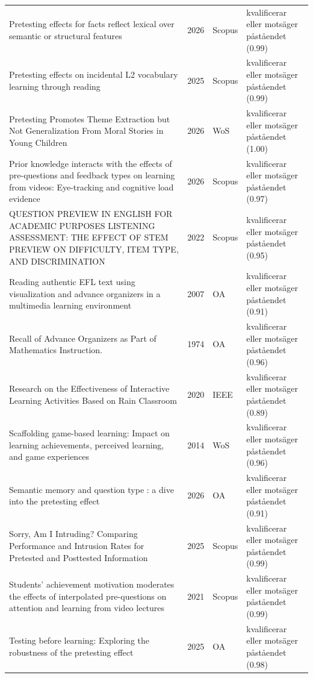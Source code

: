 \begin{longtable}{@{}%
  >{\raggedright\arraybackslash}p{}c%
  >{\raggedright\arraybackslash}p{}%
  >{\raggedright\arraybackslash}p{}@{}}
Pretesting effects for facts reflect lexical over semantic or structural features & 2026 & Scopus & kvalificerar eller motsäger påståendet (0.99) \\
Pretesting effects on incidental L2 vocabulary learning through reading & 2025 & Scopus & kvalificerar eller motsäger påståendet (0.99) \\
Pretesting Promotes Theme Extraction but Not Generalization From Moral Stories in Young Children & 2026 & WoS & kvalificerar eller motsäger påståendet (1.00) \\
Prior knowledge interacts with the effects of pre-questions and feedback types on learning from videos: Eye-tracking and cognitive load evidence & 2026 & Scopus & kvalificerar eller motsäger påståendet (0.97) \\
QUESTION PREVIEW IN ENGLISH FOR ACADEMIC PURPOSES LISTENING ASSESSMENT: THE EFFECT OF STEM PREVIEW ON DIFFICULTY, ITEM TYPE, AND DISCRIMINATION & 2022 & Scopus & kvalificerar eller motsäger påståendet (0.95) \\
Reading authentic EFL text using visualization and advance organizers in a multimedia learning environment & 2007 & OA & kvalificerar eller motsäger påståendet (0.91) \\
Recall of Advance Organizers as Part of Mathematics Instruction. & 1974 & OA & kvalificerar eller motsäger påståendet (0.96) \\
Research on the Effectiveness of Interactive Learning Activities Based on Rain Classroom & 2020 & IEEE & kvalificerar eller motsäger påståendet (0.89) \\
Scaffolding game-based learning: Impact on learning achievements, perceived learning, and game experiences & 2014 & WoS & kvalificerar eller motsäger påståendet (0.96) \\
Semantic memory and question type : a dive into the pretesting effect & 2026 & OA & kvalificerar eller motsäger påståendet (0.91) \\
Sorry, Am I Intruding? Comparing Performance and Intrusion Rates for Pretested and Posttested Information & 2025 & Scopus & kvalificerar eller motsäger påståendet (0.99) \\
Students' achievement motivation moderates the effects of interpolated pre-questions on attention and learning from video lectures & 2021 & Scopus & kvalificerar eller motsäger påståendet (0.99) \\
Testing before learning: Exploring the robustness of the pretesting effect & 2025 & OA & kvalificerar eller motsäger påståendet (0.98) \\

\end{longtable}
